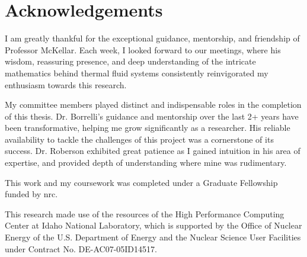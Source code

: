    \chapter{Acknowledgements}
   I am greatly thankful for the exceptional guidance, mentorship, and friendship of Professor McKellar. Each week, I looked forward to our meetings, where his wisdom, reassuring presence, and deep understanding of the intricate mathematics behind thermal fluid systems consistently reinvigorated my enthusiasm towards this research. 

   My committee members played distinct and indispensable roles in the completion of this thesis. Dr. Borrelli's guidance and mentorship over the last 2+ years have been transformative, helping me grow significantly as a researcher. His reliable availability to tackle the challenges of this project was a cornerstone of its success. Dr. Roberson exhibited great patience as I gained intuition in his area of expertise, and provided depth of understanding where mine was rudimentary. 

   This work and my coursework was completed under a Graduate Fellowship funded by \acf{nrc}.
   
   This research made use of the resources of the High Performance Computing Center at Idaho National Laboratory, which is supported by the Office of Nuclear Energy of the U.S. Department of Energy and the Nuclear Science User Facilities under Contract No. DE-AC07-05ID14517.

